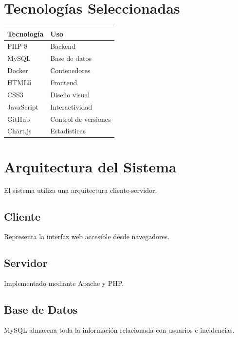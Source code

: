 \documentclass[12pt,letterpaper,oneside]{extreport}
\begin{document}
\chapter{Tecnologías Seleccionadas}

\begin{longtable}{|p{5cm}|p{7cm}|}
\hline
\textbf{Tecnología} & \textbf{Uso} \\
\hline
PHP 8 & Backend \\
\hline
MySQL & Base de datos \\
\hline
Docker & Contenedores \\
\hline
HTML5 & Frontend \\
\hline
CSS3 & Diseño visual \\
\hline
JavaScript & Interactividad \\
\hline
GitHub & Control de versiones \\
\hline
Chart.js & Estadísticas \\
\hline
\end{longtable}

\chapter{Arquitectura del Sistema}

El sistema utiliza una arquitectura cliente-servidor.

\section{Cliente}

Representa la interfaz web accesible desde navegadores.

\section{Servidor}

Implementado mediante Apache y PHP.

\section{Base de Datos}

MySQL almacena toda la información relacionada con usuarios e incidencias.

\end{document}
